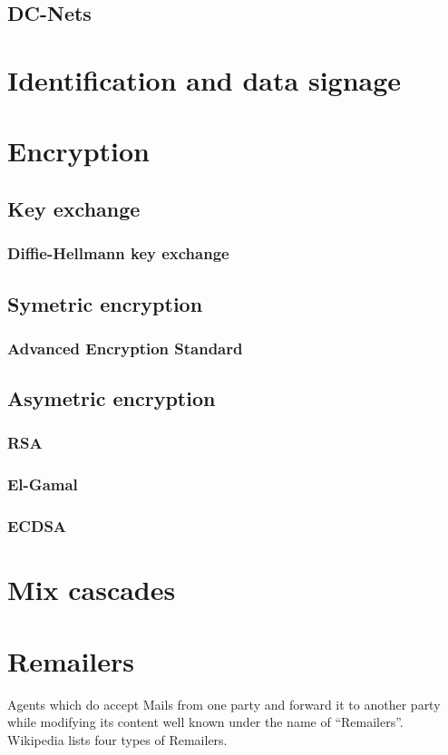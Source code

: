 \subsection{DC-Nets}
\cite{chaum-dc}
\section{Identification and data signage}
\section{Encryption}
\subsection{Key exchange}
\subsubsection{Diffie-Hellmann key exchange}
\subsection{Symetric encryption}
\subsubsection{Advanced Encryption Standard}
\subsection{Asymetric encryption}
\subsubsection{RSA}
\subsubsection{El-Gamal}
\subsubsection{ECDSA}
\section{Mix cascades}
\section{Remailers}
Agents which do accept Mails from one party and forward it to another party while modifying its content well known under the name of ``Remailers''. Wi\-ki\-pe\-dia \cite{wiki:remailer} lists four types of Remailers.\par

